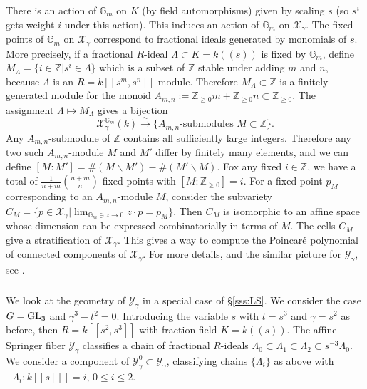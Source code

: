\documentclass[]{pcmi}
\let\oldsubsubsection\subsubsection
\renewcommand{\subsubsection}[1]{%
\setcounter{subsubsection}{\value{equation}}%
\oldsubsubsection{#1}%
\refstepcounter{equation}%
}
\theoremstyle{plain}
\theoremstyle{definition}
\def\GG{\mathbb{G}}
\def\ZZ{\mathbb{Z}}
\newcommand{\sX}{\ensuremath{\mathscr{X}}\xspace}
\newcommand{\sY}{\ensuremath{\mathscr{Y}}\xspace}
\newcommand{\sX}{\ensuremath{\mathcal{X}}\xspace}
\newcommand{\sY}{\ensuremath{\mathcal{Y}}\xspace}
\newcommand\GL{\textup{GL}}
\newcommand{\Gm}{\GG_m}
\newcommand{\isom}{\stackrel{\sim}{\to}}
\renewcommand{\L}{\Lambda}
\newcommand{\bs}{\backslash}
\newcommand{\tl}[1]{[\![#1]\!]}
\newcommand{\lr}[1]{(\!(#1)\!)}
\begin{document}
There is an action of $\Gm$ on $K$ (by field automorphisms) given by scaling $s$ (so $s^{i}$ gets weight $i$ under this action). This induces an action of $\Gm$ on $\sX_{\gamma}$. The fixed points of $\Gm$ on $\sX_{\gamma}$ correspond to fractional ideals generated by monomials of $s$. More precisely, if a fractional $R$-ideal $\L\subset K=k\lr{s}$ is fixed by $\Gm$,  define $M_{\L}=\{i\in\ZZ|s^{i}\in \L\}$ which is a subset of $\ZZ$ stable under adding $m$ and $n$, because $\L$ is an $R=k\tl{s^{m},s^{n}}$-module. Therefore $M_{\L}\subset\ZZ$ is a finitely generated module for the monoid $A_{m,n}:=\ZZ_{\geq 0}m+\ZZ_{\geq0}n\subset\ZZ_{\geq 0}$. The assignment $\L\mapsto M_{\L}$ gives a bijection
\begin{equation*}
\sX_{\gamma}^{\Gm}(k)\isom\{\mbox{$A_{m,n}$-submodules $M\subset \ZZ$}\}.
\end{equation*}
Any $A_{m,n}$-submodule of $\ZZ$ contains all sufficiently large integers. Therefore any two such $A_{m,n}$-module $M$ and $M'$ differ by finitely many elements, and we can define $[M:M']=\#(M\bs M')-\#(M'\bs M)$. Fox any fixed $i\in\ZZ$, we have a total of $\frac{1}{n+m}\binom{n+m}{n}$ fixed points with $[M:\ZZ_{\geq0}]=i$. For a fixed point $p_{M}$ corresponding to an $A_{m,n}$-module $M$, consider the subvariety $C_{M}=\{p\in\sX_{\gamma}|\lim_{\Gm\ni z\to0}z\cdot p=p_{M}\}$. Then $C_{M}$ is isomorphic to an affine space whose dimension can be expressed combinatorially in terms of $M$. The cells $C_{M}$ give a stratification of $\sX_{\gamma}$. This gives a way to compute the Poincar\'e polynomial of connected components of $\sX_{\gamma}$. For more details, and the similar picture for $\sY_{\gamma}$, see \cite{LS}.

\subsubsection{} We look at the geometry of $\sY_{\gamma}$ in a special case of \S\ref{sss:LS}. We consider the case $G=\GL_{3}$ and $\gamma^{3}-t^{2}=0$. Introducing the variable $s$ with $t=s^{3}$ and $\gamma=s^{2}$ as before, then $R=k\tl{s^{2},s^{3}}$ with fraction field $K=k\lr{s}$. The affine Springer fiber  $\sY_{\gamma}$ classifies a chain of fractional $R$-ideals $\L_{0}\subset \L_{1}\subset \L_{2}\subset s^{-3}\L_{0}$.  We consider a component of $\sY^{0}_{\gamma}\subset\sY_{\gamma}$, classifying chains $\{\L_{i}\}$ as above with $[\L_{i}:k\tl{s}]=i$, $0\leq i\leq 2$. 
\end{document}
